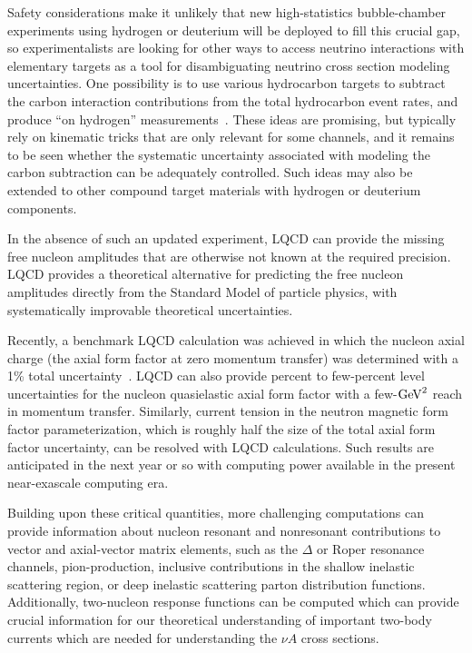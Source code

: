 \documentclass{ar-1col}
\begin{document}
Safety considerations make it unlikely that new high-statistics bubble-chamber experiments using
hydrogen or deuterium will be deployed to fill this crucial gap,
so experimentalists are looking for other ways to access neutrino interactions
with elementary targets as a tool for disambiguating neutrino cross section modeling uncertainties.
One possibility is to use various hydrocarbon targets to subtract the carbon interaction contributions from
the total hydrocarbon event rates, and produce ``on hydrogen'' measurements~\cite{PhysRevD.92.051302, PhysRevD.101.092003, Hamacher-Baumann:2020ogq, DUNE:2021tad}.
These ideas are promising, but typically rely on kinematic tricks that are only relevant for some channels, and it remains to be seen whether the systematic uncertainty associated with modeling the carbon subtraction can be adequately controlled. Such ideas may also be extended to other compound target materials with hydrogen or deuterium components.

In the absence of such an updated experiment,
LQCD can provide the missing free nucleon amplitudes
that are otherwise not known at the required precision.
LQCD provides a theoretical alternative for predicting the free nucleon amplitudes directly from the Standard Model of particle physics, with systematically improvable theoretical uncertainties.%
\begin{marginnote}
\end{marginnote}%
Recently, a benchmark LQCD calculation was achieved in which the nucleon axial charge (the axial form factor at zero momentum transfer) was determined with a 1\% total uncertainty~\cite{Chang:2018uxx}.
LQCD can also provide percent to few-percent level uncertainties for the nucleon quasielastic axial form factor with a few-${\rm GeV}^2$ reach in momentum transfer.
Similarly, current tension in the neutron magnetic form factor parameterization, which is roughly half the size of the total axial form factor uncertainty, can be resolved with LQCD calculations.
Such results are anticipated in the next year or so with computing power available in the present near-exascale computing era.

Building upon these critical quantities, more challenging computations can provide information about nucleon
resonant and nonresonant contributions to vector and axial-vector matrix elements,
such as the $\Delta$ or Roper resonance channels, pion-production,
inclusive contributions in the shallow inelastic scattering region,
or deep inelastic scattering parton distribution functions.
Additionally, two-nucleon response functions can be computed which can provide crucial information for our theoretical understanding of important two-body currents which are needed for understanding the $\nu A$ cross sections.
\end{document}
